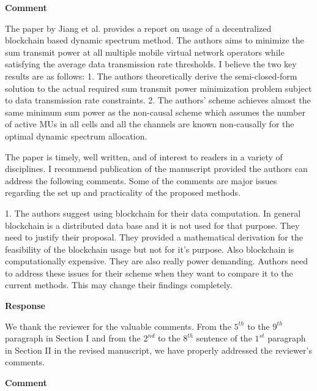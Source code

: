 \documentclass[12pt,draftcls, onecolumn]{IEEEtran}
\begin{document}
\vspace{3mm} \noindent\textcolor[rgb]{1.00,0.00,0.00}{\textbf{Comment}}
\vspace{3mm}

The paper by Jiang et al. provides a report on usage of a decentralized blockchain based dynamic spectrum method. The authors aims to minimize the sum transmit power at all multiple mobile virtual network operators while satisfying the average data transmission rate thresholds. I believe the two key results are as follows: 1. The authors theoretically derive the semi-closed-form solution to the actual required sum transmit power minimization problem subject to data transmission rate constraints. 2. The authors' scheme achieves almost the same minimum sum power as the non-causal scheme which assumes the number of active MUs in all cells and all the channels are known non-causally for the optimal dynamic spectrum allocation.

The paper is timely, well written, and of interest to readers in a variety of disciplines. I recommend publication of the manuscript provided the authors can address the following comments. Some of the comments are major issues regarding the set up and practicality of the proposed methods.
 
1. The authors suggest using blockchain for their data computation. In general blockchain is a distributed data base and it is not used for that purpose. They need to justify their proposal. They provided a mathematical derivation for the feasibility of the blockchain usage but not for it's purpose. Also blockchain is computationally expensive. They are also really power demanding. Authors need to address these issues for their scheme when they want to compare it to the current methods. This may change their findings completely.

\vspace{3mm} \noindent\textcolor[rgb]{0.00,0.00,1.00}{\textbf{Response}}
\vspace{2mm}

We thank the reviewer for the valuable comments. From the $ 5^{th} $ to the $ 9^{th} $ paragraph in Section I and from the $ 2^{nd} $ to the $ 8^{th} $ sentence of the $ 1^{st} $ paragraph in Section II in the revised manuscript, we have properly addressed the reviewer's comments.

\vspace{3mm}
\noindent\textcolor[rgb]{1.00,0.00,0.00}{\textbf{Comment}}
\vspace{3mm}
\end{document}
